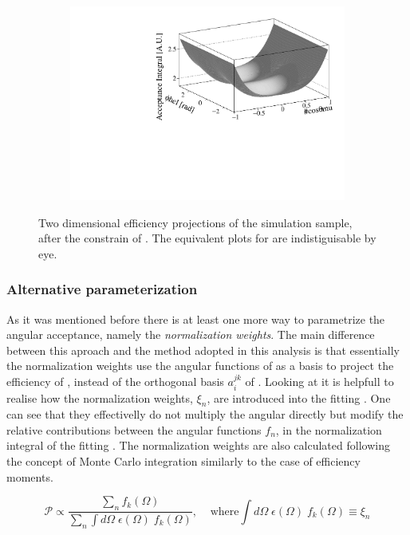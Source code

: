 \begin{figure}[h]
\begin{subfigure}{0.5\textwidth}
    \includegraphics[width=\textwidth]{Figures/Chapter4/canv_cosThL_phi_Sim08_3fb_hel_negKaons_all.pdf}
    \caption{}
    \label{eff2D_lp}
  \end{subfigure}
\caption{Two dimensional efficiency projections of the \BsJpsiKst simulation sample, after the constrain of .
         The equivalent plots for \BsbarJpsiKst are indistiguisable by eye.}
    \label{eff2D}
\end{figure}


\subsubsection{Alternative parameterization}
As it was mentioned before there is at least one more way to parametrize the angular acceptance, namely the \emph{normalization weights}.
The main difference between this aproach and the method adopted in this analysis is that essentially the normalization weights use the angular functions
of  as a basis to project the efficiency of , instead of the orthogonal basis $a_i^{jk}$ of .
Looking at  it is helpfull to realise how the normalization weights, $\xi_n$, are introduced into the fitting \pdf. 
One can see that they effectivelly do not multiply the angular \pdf directly but modify the relative contributions between the angular functions
$f_n$, in the normalization integral of the fitting \pdf. The normalization weights are also calculated following the concept of Monte Carlo integration
similarly to the case of efficiency moments.

\begin{equation}
  \mathcal{P} \propto \frac{\sum_n f_k(\Omega)}{\sum_n \int d\Omega \; \epsilon(\Omega) \; f_k(\Omega)}, \;\;\;\;\text{where} \int d\Omega \; \epsilon(\Omega) \; f_k(\Omega) \equiv \xi_n 
  \label{norm_weights_pdf}
\end{equation}

